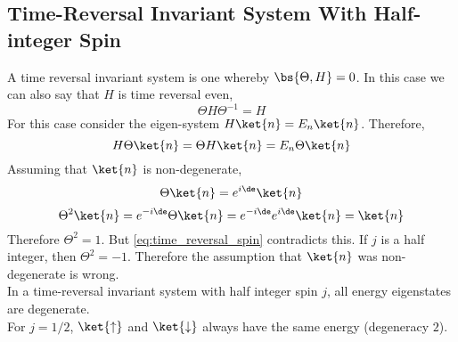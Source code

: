 \documentclass{article}
\begin{document}
\subsection{Time-Reversal Invariant System With Half-integer Spin}
A time reversal invariant system is one whereby $\bs{\Theta, H} = 0$. In this case we can also say that $H$ is time reversal even,
\[ \Theta H \Theta^{-1} = H \]
For this case consider the eigen-system $H\ket{n} = E_n\ket{n}$. Therefore,
\[ H \Theta \ket{n} = \Theta H \ket{n} = E_n \Theta \ket{n} \]
Assuming that $\ket{n}$ is non-degenerate,
\[ \Theta \ket{n} = e^{i \de} \ket{n} \]
\[ \Theta^2 \ket{n} = e^{-i\de} \Theta \ket{n} = e^{-i\de}e^{i\de} \ket{n} = \ket{n} \]
Therefore $\Theta^2 = 1$. But \cref{eq:time_reversal_spin} contradicts this. If $j$ is a half integer, then $\Theta^2 = -1$. Therefore the assumption that $\ket{n}$ was non-degenerate is wrong.\\

 In a time-reversal invariant system with half integer spin $j$, all energy eigenstates are degenerate.\\

For $j = 1/2$, $\ket{\uparrow}$ and $\ket{\downarrow}$ always have the same energy (degeneracy $2$).
\end{document}
